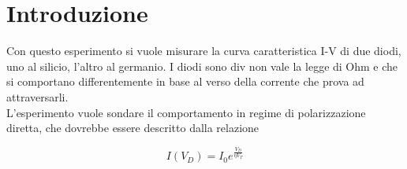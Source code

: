 \documentclass[@SRC@/main]{subfiles}
\begin{document}
\section{Introduzione} \label{sec:introduzione}
Con questo esperimento si vuole misurare la curva caratteristica
\mbox{I-V} di due diodi, uno al silicio, l'altro al germanio.
I diodi sono div
non vale la legge di Ohm e che si comportano differentemente in
base al verso della corrente che prova ad attraversarli. \\
L'esperimento vuole sondare il comportamento in regime di
polarizzazione diretta, che dovrebbe essere descritto dalla
relazione

\begin{equation}
\label{eq:caratteristiche}
I(V_D) = I_0 e^{\frac{V_D}{\eta V_T}}
\end{equation}
\end{document}
